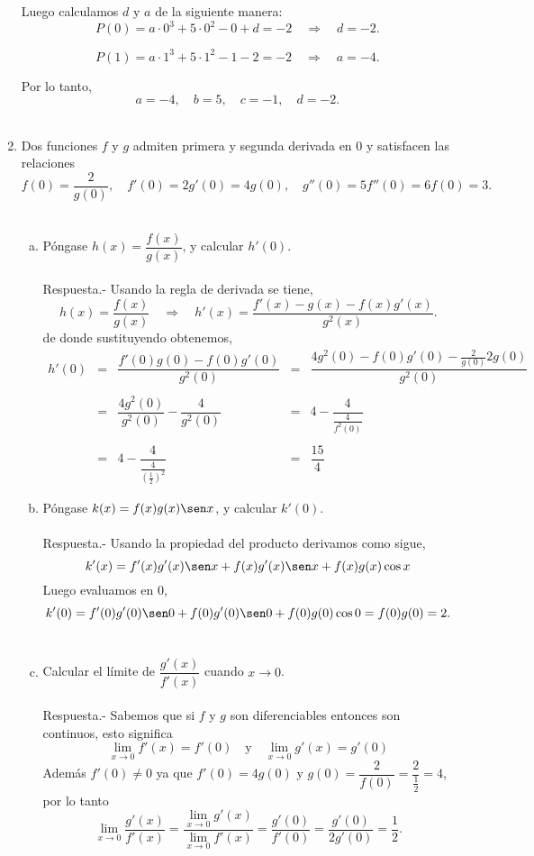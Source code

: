\begin{enumerate}[\bfseries 1.]
	Luego calculamos $d$ y $a$ de la siguiente manera:
	$$P(0)=a\cdot 0^3+5\cdot 0^2-0+d=-2\quad \Rightarrow \quad d=-2.$$

	$$P(1)=a\cdot 1^3+5\cdot 1^2-1-2=-2\quad \Rightarrow \quad a=-4.$$

	Por lo tanto,
	$$a=-4,\quad b=5,\quad c=-1,\quad d=-2.$$\\

    \item Dos funciones $f$ y $g$ admiten primera y segunda derivada en $0$ y satisfacen las relaciones 
	$$f(0)=\dfrac{2}{g(0)},\quad f'(0)=2g'(0)=4g(0),\quad g''(0)=5f''(0)=6f(0)=3.$$\\

	\begin{enumerate}[a)]

	    \item Póngase $h(x)=\dfrac{f(x)}{g(x)}$, y calcular $h'(0).$\\\\
		Respuesta.-\; Usando la regla de derivada se tiene,
		$$h(x)=\dfrac{f(x)}{g(x)}\quad \Rightarrow \quad h'(x)=\dfrac{f'(x)-g(x)-f(x)g'(x)}{g^2(x)}.$$
		de donde sustituyendo obtenemos,
		$$\begin{array}{rcccl}
		    h'(0)&=&\dfrac{f'(0)g(0)-f(0)g'(0)}{g^2(0)}&=&\dfrac{4g^2(0)-f(0)g'(0)-\frac{2}{g(0)}2g(0)}{g^2(0)}\\\\
			 &=&\dfrac{4g^2(0)}{g^2(0)}-\dfrac{4}{g^2(0)} &=& 4-\dfrac{4}{\frac{4}{f^2(0)}}\\\\
			 &=& 4-\dfrac{4}{\frac{4}{\left(\frac{1}{2}\right)^2}}&=&\dfrac{15}{4}
		\end{array}$$
		\vspace{.7cm}

	    \item Póngase $k(x)=f(x)g(x)\sen x$, y calcular $k'(0).$\\\\
		Respuesta.-\; Usando la propiedad del producto derivamos como sigue,\\
		$$k'(x)=f'(x)g'(x)\sen x + f(x)g'(x)\sen x + f(x)g(x)\cos x$$
		Luego evaluamos en $0$,
		$$k'(0)=f'(0)g'(0)\sen 0 + f(0)g'(0)\sen 0 + f(0)g(0)\cos 0 = f(0)g(0)=2.$$\\

	    \item Calcular el límite de $\dfrac{g'(x)}{f'(x)}$ cuando $x\to 0$.\\\\
		Respuesta.-\; Sabemos que si $f$ y $g$ son diferenciables entonces son continuos, esto significa
		$$\lim_{x\to 0}f'(x)=f'(0)\quad \mbox{y}\quad \lim_{x\to 0}g'(x)=g'(0)$$
		Además $f'(0)\neq 0$ ya que $f'(0)=4g(0)$ y $g(0)=\dfrac{2}{f(0)}=\dfrac{2}{\frac{1}{2}}=4$, por lo tanto
		$$\lim_{x\to 0}\dfrac{g'(x)}{f'(x)}=\dfrac{\lim\limits_{x\to 0}g'(x)}{\lim\limits_{x\to 0}f'(x)}=\dfrac{g'(0)}{f'(0)}=\dfrac{g'(0)}{2g'(0)}=\dfrac{1}{2}.$$\\


\end{enumerate}
\end{enumerate}
